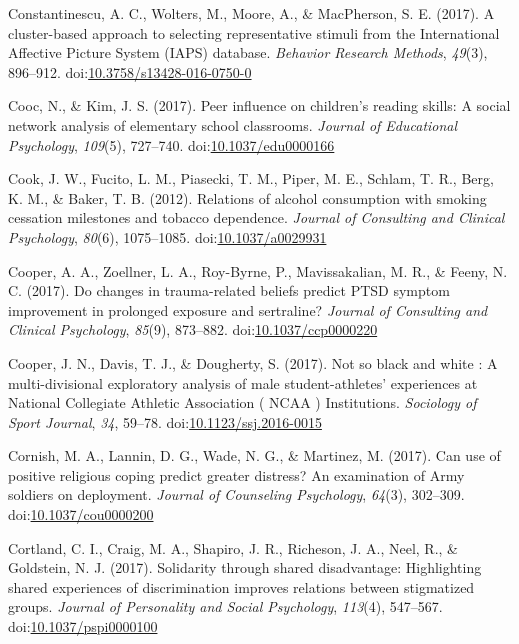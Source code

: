 \documentclass[english,man]{apa6}
\theoremstyle{definition}
\theoremstyle{definition}
\theoremstyle{definition}
\theoremstyle{remark}
\begin{document}
\hypertarget{ref-Constantinescu2017}{}
Constantinescu, A. C., Wolters, M., Moore, A., \& MacPherson, S. E.
(2017). A cluster-based approach to selecting representative stimuli
from the International Affective Picture System (IAPS) database.
\emph{Behavior Research Methods}, \emph{49}(3), 896--912.
doi:\href{https://doi.org/10.3758/s13428-016-0750-0}{10.3758/s13428-016-0750-0}

\hypertarget{ref-Cooc2017}{}
Cooc, N., \& Kim, J. S. (2017). Peer influence on children's reading
skills: A social network analysis of elementary school classrooms.
\emph{Journal of Educational Psychology}, \emph{109}(5), 727--740.
doi:\href{https://doi.org/10.1037/edu0000166}{10.1037/edu0000166}

\hypertarget{ref-Cook2012}{}
Cook, J. W., Fucito, L. M., Piasecki, T. M., Piper, M. E., Schlam, T.
R., Berg, K. M., \& Baker, T. B. (2012). Relations of alcohol
consumption with smoking cessation milestones and tobacco dependence.
\emph{Journal of Consulting and Clinical Psychology}, \emph{80}(6),
1075--1085.
doi:\href{https://doi.org/10.1037/a0029931}{10.1037/a0029931}

\hypertarget{ref-Cooper2017a}{}
Cooper, A. A., Zoellner, L. A., Roy-Byrne, P., Mavissakalian, M. R., \&
Feeny, N. C. (2017). Do changes in trauma-related beliefs predict PTSD
symptom improvement in prolonged exposure and sertraline? \emph{Journal
of Consulting and Clinical Psychology}, \emph{85}(9), 873--882.
doi:\href{https://doi.org/10.1037/ccp0000220}{10.1037/ccp0000220}

\hypertarget{ref-Cooper2017}{}
Cooper, J. N., Davis, T. J., \& Dougherty, S. (2017). Not so black and
white : A multi-divisional exploratory analysis of male
student-athletes' experiences at National Collegiate Athletic
Association ( NCAA ) Institutions. \emph{Sociology of Sport Journal},
\emph{34}, 59--78.
doi:\href{https://doi.org/10.1123/ssj.2016-0015}{10.1123/ssj.2016-0015}

\hypertarget{ref-Cornish2017}{}
Cornish, M. A., Lannin, D. G., Wade, N. G., \& Martinez, M. (2017). Can
use of positive religious coping predict greater distress? An
examination of Army soldiers on deployment. \emph{Journal of Counseling
Psychology}, \emph{64}(3), 302--309.
doi:\href{https://doi.org/10.1037/cou0000200}{10.1037/cou0000200}

\hypertarget{ref-Cortland2017}{}
Cortland, C. I., Craig, M. A., Shapiro, J. R., Richeson, J. A., Neel,
R., \& Goldstein, N. J. (2017). Solidarity through shared disadvantage:
Highlighting shared experiences of discrimination improves relations
between stigmatized groups. \emph{Journal of Personality and Social
Psychology}, \emph{113}(4), 547--567.
doi:\href{https://doi.org/10.1037/pspi0000100}{10.1037/pspi0000100}
\end{document}
